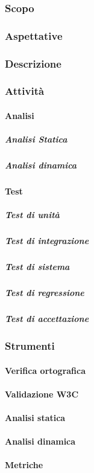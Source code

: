 	\subsubsection{Scopo}
	\subsubsection{Aspettative}
	\subsubsection{Descrizione}
	\subsubsection{Attività}
		\paragraph{Analisi}
			\subparagraph{Analisi Statica}
			\subparagraph{Analisi dinamica}
		\paragraph{Test}
			\subparagraph{Test di unità}
			\subparagraph{Test di integrazione}
			\subparagraph{Test di sistema}
			\subparagraph{Test di regressione}					
			\subparagraph{Test di accettazione}
	\subsubsection{Strumenti}
			\paragraph{Verifica ortografica}
			\paragraph{Validazione W3C}
			\paragraph{Analisi statica}
			\paragraph{Analisi dinamica}
			\paragraph{Metriche}
			